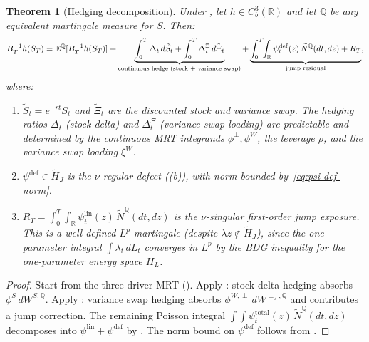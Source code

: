 \documentclass[11pt,a4paper]{article}
\theoremstyle{plain}
\newtheorem{theorem}{Theorem}[section]
\theoremstyle{definition}
\theoremstyle{remark}
\newcommand{\E}{\mathbb{E}}
\newcommand{\R}{\mathbb{R}}
\newcommand{\QQ}{\mathbb{Q}}
\newcommand{\Ntilde}{\widetilde{N}}
\begin{document}
\begin{theorem}[Hedging decomposition]\label{thm:hedging-main}
Under ,
let $h \in C_b^3(\R)$
and let $\QQ$ be any equivalent martingale measure for $S$.  Then:
\begin{equation}\label{eq:hedging-decomp}
  B_T^{-1}h(S_T)
  = \E^\QQ[B_T^{-1}h(S_T)]
  + \underbrace{\int_0^T \Delta_t\,d\tilde{S}_t
  + \int_0^T \Delta_t^\Xi\,d\tilde{\Xi}_t}_{%
  \text{continuous hedge (stock $+$ variance swap)}}
  + \underbrace{\int_0^T\!\!\int_\R
  \psi_t^{\mathrm{def}}(z)\,\Ntilde^\QQ(dt,dz)
  + R_T}_{\text{jump residual}},
\end{equation}
where:
\begin{enumerate}[label=(\alph*)]
\item $\tilde{S}_t = e^{-rt}S_t$ and $\tilde{\Xi}_t$ are the
  discounted stock and variance swap.  The hedging ratios
  $\Delta_t$ (stock delta) and $\Delta_t^\Xi$ (variance swap
  loading) are predictable and determined by the continuous
  MRT integrands $\phi^\perp, \phi^W$, the leverage $\rho$,
  and the variance swap loading $\xi^W$.
\item $\psi^{\mathrm{def}} \in \widetilde{H}_J$ is the
  $\nu$-regular defect ((b)), with
  norm bounded by~\eqref{eq:psi-def-norm}.
\item $R_T = \int_0^T\!\!\int_\R \psi_t^{\mathrm{lin}}(z)\,
  \Ntilde^\QQ(dt,dz)$ is the $\nu$-singular first-order jump
  exposure.  This is a well-defined $L^p$-martingale (despite
  $\lambda z \notin \widetilde{H}_J$), since the
  \emph{one-parameter} integral $\int \lambda_t\,dL_t$
  converges in $L^p$ by the BDG inequality for the one-parameter
  energy space $H_L$.
\end{enumerate}
\end{theorem}

\begin{proof}
Start from the three-driver MRT ().  Apply
: stock delta-hedging absorbs
$\phi^S\,dW^{S,\QQ}$.
Apply : variance swap hedging absorbs
$\phi^{W,\perp}\,dW^{\perp_\star,\QQ}$ and contributes a
jump correction.  The remaining Poisson integral
$\int\!\!\int \psi_t^{\mathrm{total}}(z)\,\Ntilde^\QQ(dt,dz)$
decomposes into $\psi^{\mathrm{lin}} + \psi^{\mathrm{def}}$ by
.  The norm bound on $\psi^{\mathrm{def}}$
follows from .
\end{proof}
\end{document}
